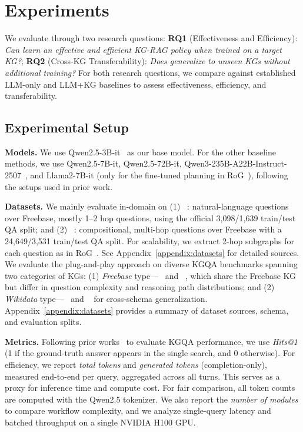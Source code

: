\section{Experiments}
\label{sec:experiments}

We evaluate \framework{} through two research questions: \textbf{RQ1} (Effectiveness and Efficiency): \emph{Can \framework{} learn an effective and efficient KG-RAG policy when trained on a target KG?}; \textbf{RQ2} (Cross-KG Transferability): \emph{Does \framework{} generalize to unseen KGs without additional training?}
For both research questions, we compare against established LLM-only and LLM+KG baselines to assess effectiveness, efficiency, and transferability.

\subsection{Experimental Setup}

\noindent \textbf{Models.}
We use Qwen2.5-3B-it~\citep{qwen2025qwen25technicalreport} as our base model. For the other baseline methods, we use Qwen2.5-7B-it, Qwen2.5-72B-it, Qwen3-235B-A22B-Instruct-2507~\citep{yang2025qwen3}, and Llama2-7B-it (only for the fine-tuned planning in RoG~\citep{Luo2024RoG}), following the setups used in prior work.

\noindent \textbf{Datasets.}
We mainly evaluate \framework{} in-domain on (1) ~\citep{Yih2016WebQSP}: natural-language questions over Freebase, mostly 1–2 hop questions, using the official 3{,}098/1{,}639 train/test QA split; and (2) ~\citep{Talmor2018CWQ}: compositional, multi-hop questions over Freebase with a 24{,}649/3{,}531 train/test QA split. For scalability, we extract 2-hop subgraphs for each question as in RoG~\citep{Luo2024RoG}. See Appendix~\ref{appendix:datasets} for detailed sources.
We evaluate the plug-and-play approach on diverse KGQA benchmarks spanning two categories of KGs: (1) \emph{Freebase} type---~\citep{bordes2015simplequestions} and ~\citep{gu2021grailqa}, which share the Freebase KG but differ in question complexity and reasoning path distributions; and (2) \emph{Wikidata} type---~\citep{elsahar2018trex} and ~\citep{usbeck2023qald10} for cross-schema generalization. Appendix~\ref{appendix:datasets} provides a summary of dataset sources, schema, and evaluation splits.

\noindent \textbf{Metrics.} Following prior works~\citep{Luo2024RoG, Sun2024ToG, Chen2024Pog, park2026prograg} to evaluate KGQA performance, we use \textit{Hits@1} (1 if the ground-truth answer appears in the single search, and 0 otherwise). For efficiency, we report \emph{total tokens} and \emph{generated tokens} (completion-only), measured end-to-end per query, aggregated across all turns. 
This serves as a proxy for inference time and compute cost. For fair comparison, all token counts are computed with the Qwen2.5 tokenizer. We also report the \emph{number of modules} to compare workflow complexity, and we analyze single-query latency and batched throughput on a single NVIDIA H100 GPU.


